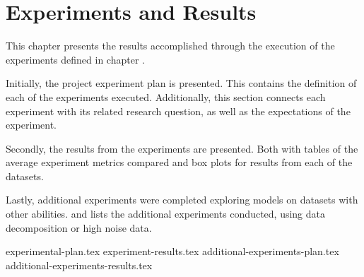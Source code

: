 \chapter{Experiments and Results}
\label{section:Results}

This chapter presents the results accomplished through the execution of the experiments defined in chapter .

Initially, the project experiment plan is presented.
This contains the definition of each of the experiments executed.
Additionally, this section connects each experiment with its related research question,
as well as the expectations of the experiment.

Secondly, the results from the experiments are presented.
Both with tables of the average experiment metrics compared and box plots for results from each of the datasets.

Lastly, additional experiments were completed exploring models on datasets with other abilities.
 and 
lists the additional experiments conducted, using data decomposition or high noise data.


{experimental-plan.tex}
{experiment-results.tex}
{additional-experiments-plan.tex}
{additional-experiments-results.tex}




\iffalse

  \section{Experimental Setup}
  \label{sec:experimentalSetup}

  The experimental setup should include all data - parameters etc, that would allow a person to repeat your experiments.

  \section{Experimental Results}
  \label{sec:experimentalResults}

  Results should be clearly displayed and should provide a suitable representation of your results for the points you wish to make. Graphs should be labeled in a legible font and if more than one result is displayed on the same graph then these should be clearly marked.   Please choose carefully rather than presenting every results. Too much information is hard to read and often hides the key information you wish to present. Make use of statistical methods when presenting results, where possible to strengthen the results.  Further, the format of the presentation of results should be chosen based on what issues in the results you wish to highlight. You may wish to present a subset in the experimental section and provide additional results in the appendix.
\fi